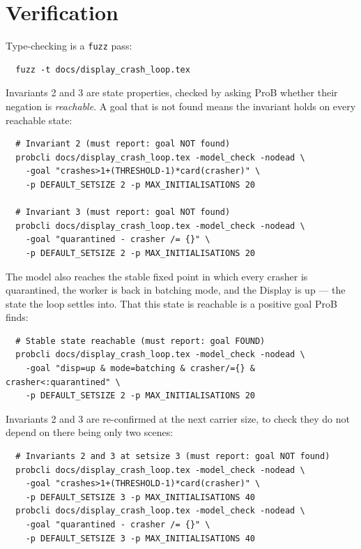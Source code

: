 \documentclass[a4paper,10pt,fleqn]{article}
\begin{document}
\section{Verification}
\label{sec:verify}

Type-checking is a \texttt{fuzz} pass:
\begin{verbatim}
  fuzz -t docs/display_crash_loop.tex
\end{verbatim}

Invariants 2 and 3 are state properties, checked by asking ProB whether their
negation is \emph{reachable}.  A goal that is not found means the invariant holds
on every reachable state:
\begin{verbatim}
  # Invariant 2 (must report: goal NOT found)
  probcli docs/display_crash_loop.tex -model_check -nodead \
    -goal "crashes>1+(THRESHOLD-1)*card(crasher)" \
    -p DEFAULT_SETSIZE 2 -p MAX_INITIALISATIONS 20

  # Invariant 3 (must report: goal NOT found)
  probcli docs/display_crash_loop.tex -model_check -nodead \
    -goal "quarantined - crasher /= {}" \
    -p DEFAULT_SETSIZE 2 -p MAX_INITIALISATIONS 20
\end{verbatim}

The model also reaches the stable fixed point in which every crasher is
quarantined, the worker is back in batching mode, and the Display is up --- the
state the loop settles into.  That this state is reachable is a positive goal ProB
finds:
\begin{verbatim}
  # Stable state reachable (must report: goal FOUND)
  probcli docs/display_crash_loop.tex -model_check -nodead \
    -goal "disp=up & mode=batching & crasher/={} & crasher<:quarantined" \
    -p DEFAULT_SETSIZE 2 -p MAX_INITIALISATIONS 20
\end{verbatim}

Invariants 2 and 3 are re-confirmed at the next carrier size, to check they do not
depend on there being only two scenes:
\begin{verbatim}
  # Invariants 2 and 3 at setsize 3 (must report: goal NOT found)
  probcli docs/display_crash_loop.tex -model_check -nodead \
    -goal "crashes>1+(THRESHOLD-1)*card(crasher)" \
    -p DEFAULT_SETSIZE 3 -p MAX_INITIALISATIONS 40
  probcli docs/display_crash_loop.tex -model_check -nodead \
    -goal "quarantined - crasher /= {}" \
    -p DEFAULT_SETSIZE 3 -p MAX_INITIALISATIONS 40
\end{verbatim}
\end{document}
